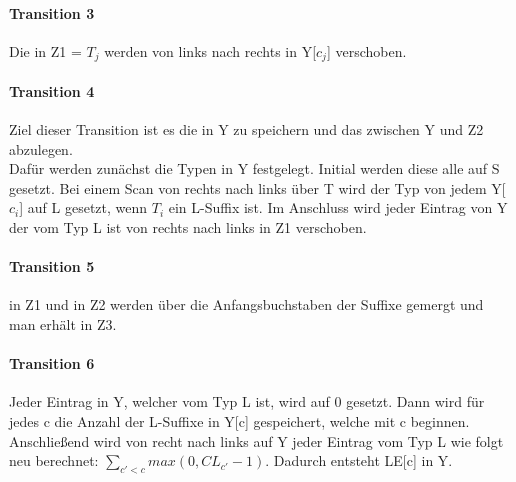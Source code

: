 \paragraph{Transition 3}
Die \lmsx in Z1 = $T_{j}$ werden von links nach rechts in Y[$c_{j}$] verschoben.
\paragraph{Transition 4}
Ziel dieser Transition ist es die \lmsy in Y zu speichern und das \SAlmsynotlmsx zwischen Y und Z2 abzulegen.\\
Dafür werden zunächst die Typen in Y festgelegt. Initial werden diese alle auf S gesetzt. Bei einem Scan von rechts nach links über T wird der Typ  von jedem Y[$c_{i}$] auf L gesetzt, wenn $T_{i}$ ein L-Suffix ist. Im   Anschluss wird jeder Eintrag von Y der vom Typ L ist von rechts nach    links in Z1 verschoben.
\paragraph{Transition 5}
\SAlmsynotlmsx in Z1 und \SAlmsxnot in Z2 werden über die Anfangsbuchstaben der Suffixe gemergt und man erhält \SAlmsynot in Z3.
\paragraph{Transition 6}
Jeder Eintrag in Y, welcher vom Typ L ist, wird auf 0 gesetzt. Dann wird für jedes c die Anzahl der L-Suffixe in Y[c] gespeichert, welche mit c beginnen. Anschließend wird von recht nach links auf Y jeder  Eintrag vom Typ L wie folgt neu berechnet: $\sum_{c'<c} max(0, CL_{c'}-1)$. Dadurch entsteht LE[c] in Y.
